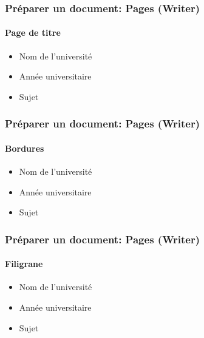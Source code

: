 \documentclass[xcolor=table]{beamer}
\begin{document}
\begin{frame}[t]
\frametitle{Préparer un document: Pages (Writer)}
\framesubtitle{Page de titre}

\begin{minipage}{0.38\textwidth}
\begin{itemize}
\item Nom de l'université 
\item Année universitaire
\item Sujet
\end{itemize}
\end{minipage}
\begin{minipage}{0.6\textwidth}
\end{minipage}

\end{frame}

\begin{frame}[t]
\frametitle{Préparer un document: Pages (Writer)}
\framesubtitle{Bordures}

\begin{minipage}{0.43\textwidth}
\begin{itemize}
\item Nom de l'université 
\item Année universitaire
\item Sujet
\end{itemize}
\end{minipage}
\begin{minipage}{0.55\textwidth}
\end{minipage}

\end{frame}

\begin{frame}[t]
\frametitle{Préparer un document: Pages (Writer)}
\framesubtitle{Filigrane}

\begin{minipage}{0.43\textwidth}
\begin{itemize}
\item Nom de l'université 
\item Année universitaire
\item Sujet
\end{itemize}
\end{minipage}
\begin{minipage}{0.55\textwidth}
\end{minipage}

\end{frame}
\end{document}

